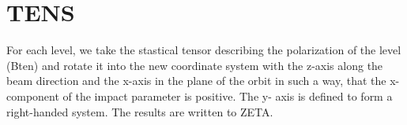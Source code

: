 \section{TENS}
\label{sect:tens}

\noindent For each level, we take the stastical tensor describing the
polarization of the level (Bten) and rotate it into the new coordinate system
with the z-axis along the beam direction and the x-axis in the plane of the
orbit in such a way, that the x-component of the impact parameter is positive.
The y- axis is defined to form a right-handed system. The results are written
to ZETA.\\

